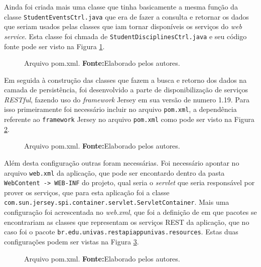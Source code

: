 	\par Ainda foi criada mais uma classe que tinha basicamente a mesma função da
classe \texttt{StudentEventsCtrl.java} que era de fazer a consulta e retornar
os dados que seriam usados pelas classes que iam tornar disponíveis os serviços
do \textit{web service}. Esta classe foi chmada de
\texttt{StudentDisciplinesCtrl.java} e seu código fonte pode ser visto na
Figura \ref{fig:desws23}.

	\begin{figure}[h!]
		
		\caption[Arquivo \texttt{pom.xml}]{Arquivo pom.xml.
		\textbf{Fonte:}Elaborado pelos autores.}
		\label{fig:desws23}
	\end{figure}
	
	\par Em seguida à construção das classes que fazem a busca e retorno dos dados
na camada de persistência, foi desenvolvido a parte de disponibilização de
serviços \textit{RESTful}, fazendo uso do \textit{framework} Jersey em sua
versão de numero {1.19}. Para isso primeiramente foi necessário incluir no
arquivo \texttt{pom.xml}, a dependência referente ao \texttt{framework} Jersey
no arquivo \texttt{pom.xml} como pode ser visto na Figura \ref{fig:desws24}.

	\begin{figure}[h!]
		
		\caption[Arquivo \texttt{pom.xml}]{Arquivo pom.xml.
		\textbf{Fonte:}Elaborado pelos autores.}
		\label{fig:desws24}
	\end{figure}
	
	\pagebreak

	\par Além desta configuração outras foram necessárias. Foi necessário apontar
no arquivo \texttt{web.xml} da aplicação, que pode ser encontardo dentro da
pasta \texttt{WebContent -> WEB-INF} do projeto, qual seria o \textit{servlet}
que seria responsável por prover os serviços, que para esta aplicação foi a
classe \texttt{com.sun.jersey.spi.container.servlet.ServletContainer}. Mais uma
configuração foi acrescentada no \textit{web.xml}, que foi a definição de em
que pacotes se encontrariam as classes que representam os serviços REST da
aplicação, que no caso foi o pacote
\texttt{br.edu.univas.restapiappunivas.resources}. Estas duas configurações
podem ser vistas na Figura \ref{fig:desws25}.

	\begin{figure}[h!]
		
		\caption[Arquivo \texttt{pom.xml}]{Arquivo pom.xml.
		\textbf{Fonte:}Elaborado pelos autores.}
		\label{fig:desws25}
	\end{figure}
	
